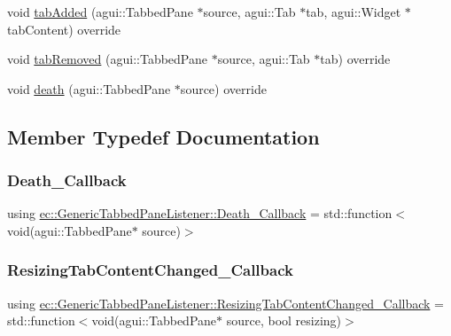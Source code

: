 \begin{DoxyCompactItemize}
\item 
void \mbox{\hyperlink{classec_1_1_generic_tabbed_pane_listener_aa00e18c320111a63c11eb9500574585d}{tab\+Added}} (agui\+::\+Tabbed\+Pane $\ast$source, agui\+::\+Tab $\ast$tab, agui\+::\+Widget $\ast$tab\+Content) override
\item 
void \mbox{\hyperlink{classec_1_1_generic_tabbed_pane_listener_a8489d4a6e19fe55d24919ebf78e83d54}{tab\+Removed}} (agui\+::\+Tabbed\+Pane $\ast$source, agui\+::\+Tab $\ast$tab) override
\item 
void \mbox{\hyperlink{classec_1_1_generic_tabbed_pane_listener_aee95a52820d4f194c9bf726301f63240}{death}} (agui\+::\+Tabbed\+Pane $\ast$source) override
\end{DoxyCompactItemize}


\subsection{Member Typedef Documentation}
\mbox{\label{classec_1_1_generic_tabbed_pane_listener_a158699bc84b6a145e3dafec53ab63061}} 
\subsubsection{\texorpdfstring{Death\+\_\+\+Callback}{Death\_Callback}}
{\footnotesize\ttfamily using \mbox{\hyperlink{classec_1_1_generic_tabbed_pane_listener_a158699bc84b6a145e3dafec53ab63061}{ec\+::\+Generic\+Tabbed\+Pane\+Listener\+::\+Death\+\_\+\+Callback}} =  std\+::function$<$void(agui\+::\+Tabbed\+Pane$\ast$ source)$>$}

\mbox{\label{classec_1_1_generic_tabbed_pane_listener_a41097f0918f8888f9e970e9c9a5f0d52}} 
\subsubsection{\texorpdfstring{Resizing\+Tab\+Content\+Changed\+\_\+\+Callback}{ResizingTabContentChanged\_Callback}}
{\footnotesize\ttfamily using \mbox{\hyperlink{classec_1_1_generic_tabbed_pane_listener_a41097f0918f8888f9e970e9c9a5f0d52}{ec\+::\+Generic\+Tabbed\+Pane\+Listener\+::\+Resizing\+Tab\+Content\+Changed\+\_\+\+Callback}} =  std\+::function$<$void(agui\+::\+Tabbed\+Pane$\ast$ source, bool resizing)$>$}

